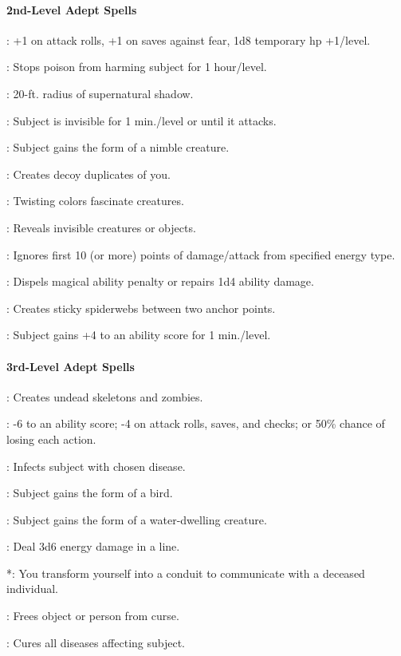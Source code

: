 \paragraph{2nd-Level Adept Spells}
\begin{list}{}{\leftmargin=1em}
\item {}: +1 on attack rolls, +1 on saves against fear, 1d8 temporary hp +1/level.
\item {}: Stops poison from harming subject for 1 hour/level.
\item {}: 20-ft. radius of supernatural shadow.
\item {}: Subject is invisible for 1 min./level or until it attacks.
\item {}: Subject gains the form of a nimble creature.
\item {}: Creates decoy duplicates of you.
\item {}: Twisting colors fascinate creatures.
\item {}: Reveals invisible creatures or objects.
\item {}: Ignores first 10 (or more) points of damage/attack from specified energy type.
\item {}: Dispels magical ability penalty or repairs 1d4 ability damage.
\item {}: Creates sticky spiderwebs between two anchor points.
\item {}: Subject gains +4 to an ability score for 1 min./level.
\end{list}
\paragraph{3rd-Level Adept Spells}
\begin{list}{}{\leftmargin=1em}
 \item {}: Creates undead skeletons and zombies.
 \item {}: -6 to an ability score; -4 on attack rolls, saves, and checks; or 50\% chance of losing each action.
 \item {}: Infects subject with chosen disease. %
 \item {}: Subject gains the form of a bird.
 \item {}: Subject gains the form of a water-dwelling creature.
 \item {}: Deal 3d6 energy damage in a line.
 \item {}*: You transform yourself into a conduit to communicate with a deceased individual.
 \item {}: Frees object or person from curse.
 \item {}: Cures all diseases affecting subject.
\end{list}
